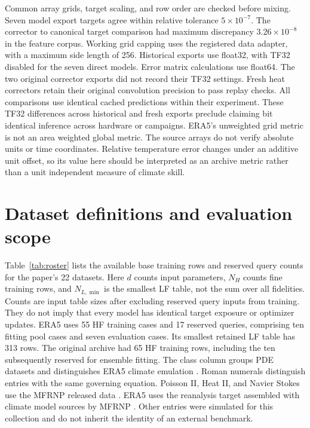 Common array grids, target scaling, and row order are checked before mixing. Seven model export
targets agree within relative tolerance $5\times10^{-7}$. The corrector to canonical target
comparison had maximum discrepancy $3.26\times10^{-8}$ in the feature corpus.
Working grid capping uses the registered data adapter, with a maximum side length of 256.
Historical exports use float32, with TF32 disabled for the seven direct models. Error matrix calculations use float64. The two original corrector exports did not record
their TF32 settings. Fresh heat correctors retain their original convolution precision to
pass replay checks. All comparisons use identical cached predictions within their experiment.
These TF32 differences across historical and fresh exports preclude claiming bit identical inference
across hardware or campaigns. ERA5's unweighted grid metric is not an area weighted global metric.
The source arrays do not verify absolute units or time coordinates. Relative
temperature error changes under an additive unit offset, so its value here
should be interpreted as an archive metric rather than a unit independent
measure of climate skill.



\section{Dataset definitions and evaluation scope}
\label{app:roster}
Table~\ref{tab:roster} lists the available base training rows and reserved query counts
for the paper's 22 datasets. Here $d$ counts input parameters, $N_H$ counts fine
training rows, and $N_{L,\min}$ is the smallest LF table, not the sum over all fidelities.
Counts are input table sizes after excluding reserved query inputs from
training. They do not imply that every model has identical target exposure
or optimizer updates. ERA5 uses 55 HF training cases and 17 reserved queries,
comprising ten fitting pool cases and seven evaluation cases. Its smallest
retained LF table has 313 rows. The original archive had 65 HF training rows,
including the ten subsequently reserved for ensemble fitting.
The class column groups PDE datasets and distinguishes ERA5 climate emulation
\citep{hersbach2020,niu2024}.
Roman numerals distinguish entries with the same governing equation.
Poisson II, Heat II, and Navier Stokes use the MFRNP released data
\citep{niu2024}. ERA5 uses the reanalysis target \citep{hersbach2020} assembled
with climate model sources by MFRNP \citep{niu2024}. Other entries were simulated
for this collection and do not inherit the identity of an external benchmark.

